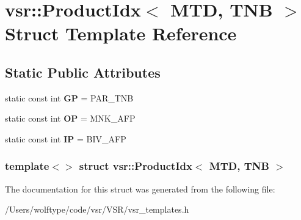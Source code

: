 \hypertarget{structvsr_1_1_product_idx_3_01_m_t_d_00_01_t_n_b_01_4}{\section{vsr\-:\-:Product\-Idx$<$ M\-T\-D, T\-N\-B $>$ Struct Template Reference}
\label{structvsr_1_1_product_idx_3_01_m_t_d_00_01_t_n_b_01_4}
}
\subsection*{Static Public Attributes}
\begin{DoxyCompactItemize}
\item 
\hypertarget{structvsr_1_1_product_idx_3_01_m_t_d_00_01_t_n_b_01_4_a79921a555081a1002c207c93ee23f229}{static const int {\bfseries G\-P} = P\-A\-R\-\_\-\-T\-N\-B}\label{structvsr_1_1_product_idx_3_01_m_t_d_00_01_t_n_b_01_4_a79921a555081a1002c207c93ee23f229}

\item 
\hypertarget{structvsr_1_1_product_idx_3_01_m_t_d_00_01_t_n_b_01_4_a7b5fab3036c2e964a52c7b7239481b0d}{static const int {\bfseries O\-P} = M\-N\-K\-\_\-\-A\-F\-P}\label{structvsr_1_1_product_idx_3_01_m_t_d_00_01_t_n_b_01_4_a7b5fab3036c2e964a52c7b7239481b0d}

\item 
\hypertarget{structvsr_1_1_product_idx_3_01_m_t_d_00_01_t_n_b_01_4_ab2364c28caf600d7def25b803fb336a6}{static const int {\bfseries I\-P} = B\-I\-V\-\_\-\-A\-F\-P}\label{structvsr_1_1_product_idx_3_01_m_t_d_00_01_t_n_b_01_4_ab2364c28caf600d7def25b803fb336a6}

\end{DoxyCompactItemize}
\subsubsection*{template$<$$>$ struct vsr\-::\-Product\-Idx$<$ M\-T\-D, T\-N\-B $>$}



The documentation for this struct was generated from the following file\-:\begin{DoxyCompactItemize}
\item 
/\-Users/wolftype/code/vsr/\-V\-S\-R/vsr\-\_\-templates.\-h\end{DoxyCompactItemize}
